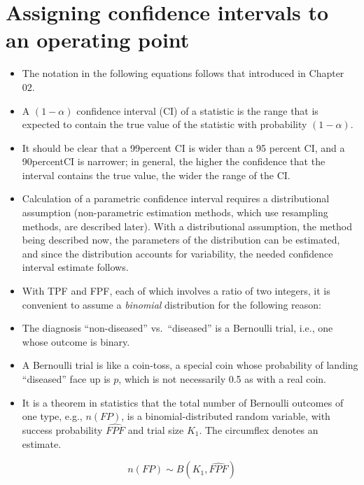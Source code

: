 \documentclass[
]{book}
\providecommand{\tightlist}{%
  \setlength{\itemsep}{0pt}\setlength{\parskip}{0pt}}
\begin{document}
\hypertarget{assigning-confidence-intervals-to-an-operating-point}{%
\section{Assigning confidence intervals to an operating point}\label{assigning-confidence-intervals-to-an-operating-point}}

\begin{itemize}
\tightlist
\item
  The notation in the following equations follows that introduced in Chapter 02.
\item
  A \((1-\alpha)\) confidence interval (CI) of a statistic is the range that is expected to contain the true value of the statistic with probability \((1-\alpha)\).
\item
  It should be clear that a 99percent CI is wider than a 95 percent CI, and a 90percentCI is narrower; in general, the higher the confidence that the interval contains the true value, the wider the range of the CI.
\item
  Calculation of a parametric confidence interval requires a distributional assumption (non-parametric estimation methods, which use resampling methods, are described later). With a distributional assumption, the method being described now, the parameters of the distribution can be estimated, and since the distribution accounts for variability, the needed confidence interval estimate follows.
\item
  With TPF and FPF, each of which involves a ratio of two integers, it is convenient to assume a \emph{binomial} distribution for the following reason:
\item
  The diagnosis ``non-diseased'' vs.~``diseased'' is a Bernoulli trial, i.e., one whose outcome is binary.
\item
  A Bernoulli trial is like a coin-toss, a special coin whose probability of landing ``diseased'' face up is \(p\), which is not necessarily 0.5 as with a real coin.
\item
  It is a theorem in statistics that the total number of Bernoulli outcomes of one type, e.g., \(n(FP)\), is a binomial-distributed random variable, with success probability \(\widehat{FPF}\) and trial size \(K_1\). The circumflex denotes an estimate.
\end{itemize}

\begin{equation} 
n(FP) \sim B\left ( K_1, \widehat{FPF} \right )
\label{eq:binaryTask-BinDistrFPF}
\end{equation}
\end{document}
